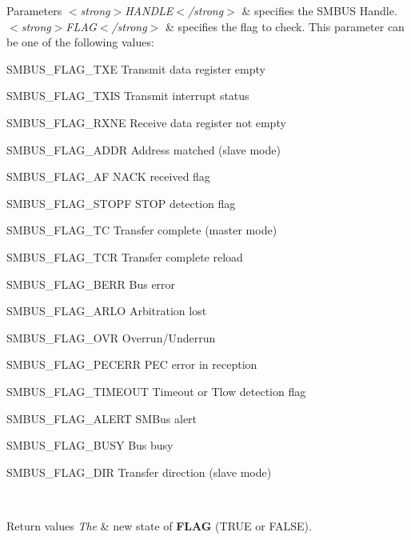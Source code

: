 \begin{DoxyParams}{Parameters}
{\em $<$strong$>$\+H\+A\+N\+D\+L\+E$<$/strong$>$} & specifies the S\+M\+B\+US Handle. \\
\hline
{\em $<$strong$>$\+F\+L\+A\+G$<$/strong$>$} & specifies the flag to check. This parameter can be one of the following values\+: \begin{DoxyItemize}
\item S\+M\+B\+U\+S\+\_\+\+F\+L\+A\+G\+\_\+\+T\+XE Transmit data register empty \item S\+M\+B\+U\+S\+\_\+\+F\+L\+A\+G\+\_\+\+T\+X\+IS Transmit interrupt status \item S\+M\+B\+U\+S\+\_\+\+F\+L\+A\+G\+\_\+\+R\+X\+NE Receive data register not empty \item S\+M\+B\+U\+S\+\_\+\+F\+L\+A\+G\+\_\+\+A\+D\+DR Address matched (slave mode) \item S\+M\+B\+U\+S\+\_\+\+F\+L\+A\+G\+\_\+\+AF N\+A\+CK received flag \item S\+M\+B\+U\+S\+\_\+\+F\+L\+A\+G\+\_\+\+S\+T\+O\+PF S\+T\+OP detection flag \item S\+M\+B\+U\+S\+\_\+\+F\+L\+A\+G\+\_\+\+TC Transfer complete (master mode) \item S\+M\+B\+U\+S\+\_\+\+F\+L\+A\+G\+\_\+\+T\+CR Transfer complete reload \item S\+M\+B\+U\+S\+\_\+\+F\+L\+A\+G\+\_\+\+B\+E\+RR Bus error \item S\+M\+B\+U\+S\+\_\+\+F\+L\+A\+G\+\_\+\+A\+R\+LO Arbitration lost \item S\+M\+B\+U\+S\+\_\+\+F\+L\+A\+G\+\_\+\+O\+VR Overrun/\+Underrun \item S\+M\+B\+U\+S\+\_\+\+F\+L\+A\+G\+\_\+\+P\+E\+C\+E\+RR P\+EC error in reception \item S\+M\+B\+U\+S\+\_\+\+F\+L\+A\+G\+\_\+\+T\+I\+M\+E\+O\+UT Timeout or Tlow detection flag \item S\+M\+B\+U\+S\+\_\+\+F\+L\+A\+G\+\_\+\+A\+L\+E\+RT S\+M\+Bus alert \item S\+M\+B\+U\+S\+\_\+\+F\+L\+A\+G\+\_\+\+B\+U\+SY Bus busy \item S\+M\+B\+U\+S\+\_\+\+F\+L\+A\+G\+\_\+\+D\+IR Transfer direction (slave mode)\end{DoxyItemize}
\\
\hline
\end{DoxyParams}

\begin{DoxyRetVals}{Return values}
{\em The} & new state of {\bfseries F\+L\+AG} (T\+R\+UE or F\+A\+L\+SE). \\
\hline
\end{DoxyRetVals}
